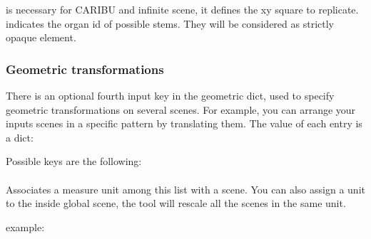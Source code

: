 \documentclass[letterpaper,10pt,english]{sphinxmanual}
\begin{document}
\sphinxAtStartPar
{} is necessary for CARIBU and infinite scene, it defines the xy square to replicate.
 indicates the organ id of possible stems. They will be considered as strictly opaque element.


\subsubsection{Geometric transformations}
\label{\detokenize{inputs:geometric-transformations}}
\sphinxAtStartPar
There is an optional fourth input key in the geometric dict, used to specify geometric transformations on several scenes.
For example, you can arrange your inputs scenes in a specific pattern by translating them.
The value of each entry is a dict:

\begin{sphinxVerbatim}[commandchars=\\\{\}]
     
\end{sphinxVerbatim}

\sphinxAtStartPar
Possible keys are the following:


\paragraph{}
\label{\detokenize{inputs:scenes-unit}}
\sphinxAtStartPar
Associates a measure unit among this list  with a scene.
You can also assign a unit to the inside global scene, the tool will rescale all the scenes in the same unit.

\sphinxAtStartPar
example:

\begin{sphinxVerbatim}[commandchars=\\\{\}]
\PYG{p}{[}\PYG{p}{]}    
                                    
                                    
\end{sphinxVerbatim}
\end{document}
